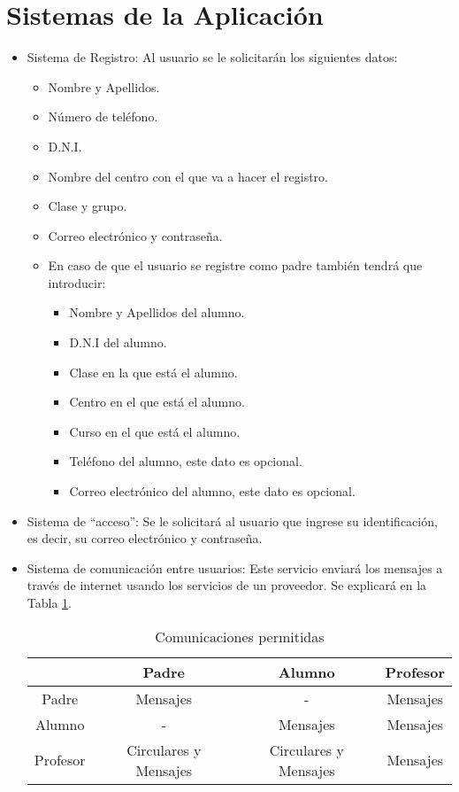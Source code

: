 	\section{Sistemas de la Aplicación}
		\begin{itemize}
			\item Sistema de Registro: Al usuario se le solicitarán los siguientes datos:
			\begin{itemize}
				\item Nombre y Apellidos.
				\item Número de teléfono.
				\item D.N.I.
				\item Nombre del centro con el que va a hacer el registro.
				\item Clase y grupo.
				\item Correo electrónico y contraseña.
				\item En caso de que el usuario se registre como padre también tendrá que introducir:
				\begin{itemize}
					\item Nombre y Apellidos del alumno.
					\item D.N.I del alumno.
					\item Clase en la que está el alumno.
					\item Centro en el que está el alumno.
					\item Curso en el que está el alumno.
					\item Teléfono del alumno, este dato es opcional.
					\item Correo electrónico del alumno, este dato es opcional.
				\end{itemize}
			\end{itemize}
			\item Sistema de ``acceso'': Se le solicitará al usuario que ingrese su identificación, es decir, su correo electrónico y contraseña.
			\item Sistema de comunicación entre usuarios: Este servicio enviará los mensajes a través de internet usando los servicios de un proveedor. Se explicará en la Tabla \ref{table:communications}.
			
			\begin{table} [!hbt]
			\begin{center}
			\begin{tabular}{|| c | c | c | c ||}
				\hline
				\hline
				& Padre & Alumno & Profesor \\
				\hline
				Padre & Mensajes & - & Mensajes \\
				\hline
				Alumno & - & Mensajes & Mensajes \\
				\hline
				Profesor & Circulares y Mensajes & Circulares y Mensajes & Mensajes \\
				\hline
				\hline
			\end{tabular}
			\caption{Comunicaciones permitidas}
			\label{table:communications}
			\end{center}
			\end{table}
			

\end{itemize}
